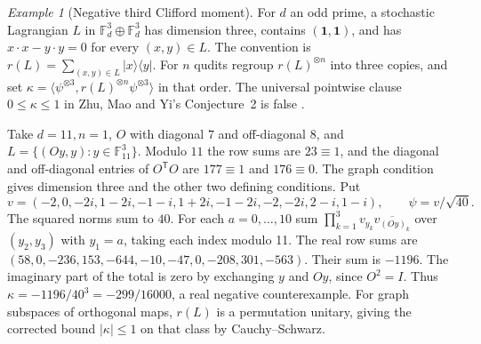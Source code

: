 \documentclass[aps,pra,onecolumn,superscriptaddress,nofootinbib,10pt]{revtex4-2}
\theoremstyle{definition}
\theoremstyle{remark}
\newtheorem{example}[theorem]{Example}
\begin{document}
\begin{example}[Negative third Clifford moment]\label{ob:thirdmoment}
For \(d\) an odd prime, a stochastic Lagrangian \(L\) in
\(\mathbb F_d^3\oplus\mathbb F_d^3\) has dimension three,
contains \((\mathbf1,\mathbf1)\), and has
\(x\cdot x-y\cdot y=0\) for every \((x,y)\in L\).
The convention is \(r(L)=\sum_{(x,y)\in L}|x\rangle\langle y|\).
For \(n\) qudits regroup \(r(L)^{\otimes n}\) into three copies,
and set \(\kappa=\langle\psi^{\otimes3},r(L)^{\otimes n}
\psi^{\otimes3}\rangle\) in that order. The universal pointwise
clause \(0\le\kappa\le1\) in Zhu, Mao and Yi's Conjecture~2
is false \cite[Eq.~(43) and Conjecture~2]{obr:zmy}.

Take \(d=11,n=1\), \(O\) with diagonal \(7\) and off-diagonal
\(8\), and \(L=\{(Oy,y):y\in\mathbb F_{11}^3\}\).
Modulo \(11\) the row sums are \(23\equiv1\), and the diagonal
and off-diagonal entries of \(O^{\mathsf T}O\) are \(177\equiv1\)
and \(176\equiv0\). The graph condition gives dimension
three and the other two defining conditions. Put
\[
 v=(-2,0,-2i,1-2i,-1-i,1+2i,-1-2i,-2,-2i,2-i,1-i),
 \qquad \psi=v/\sqrt{40}.
\]
The squared norms sum to \(40\). For each \(a=0,\ldots,10\)
sum \(\prod_{k=1}^3 v_{y_k}\overline{v_{(Oy)_k}}\) over
\((y_2,y_3)\) with \(y_1=a\), taking each index modulo 11.
The real row sums are
\((58,0,-236,153,-644,-10,-47,0,-208,301,-563)\).
Their sum is \(-1196\). The imaginary part of the total is zero
by exchanging \(y\) and \(Oy\), since \(O^2=I\).
Thus \(\kappa=-1196/40^3=-299/16000\), a real negative
counterexample. For graph subspaces of orthogonal maps, \(r(L)\) is a
permutation unitary, giving the corrected bound \(|\kappa|\le1\) on
that class by Cauchy--Schwarz.
\end{example}
\end{document}
